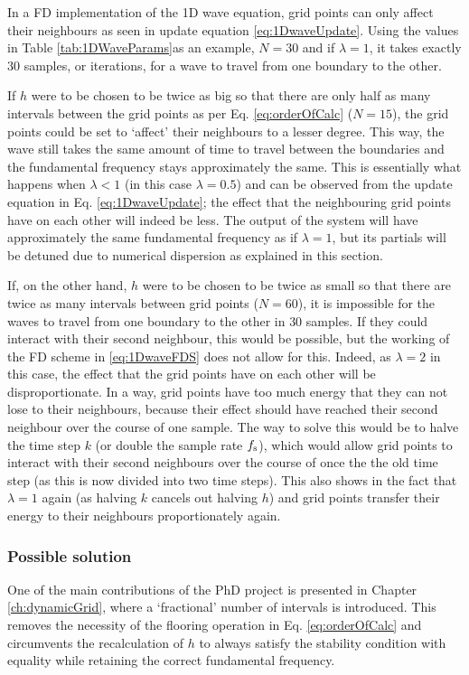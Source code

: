In a FD implementation of the 1D wave equation, grid points can only affect their neighbours as seen in update equation \eqref{eq:1DwaveUpdate}. Using the values in Table \ref{tab:1DWaveParams}as an example, $N=30$ and if $\lambda = 1$, it takes exactly $30$ samples, or iterations, for a wave to travel from one boundary to the other. 

If $h$ were to be chosen to be twice as big so that there are only half as many intervals between the grid points as per Eq. \eqref{eq:orderOfCalc} ($N=15$), the grid points could be set to `affect' their neighbours to a lesser degree. This way, the wave still takes the same amount of time to travel between the boundaries and the fundamental frequency stays approximately the same. This is essentially what happens when $\lambda < 1$ (in this case $\lambda = 0.5$) and can be observed from the update equation in Eq. \eqref{eq:1DwaveUpdate}; the effect that the neighbouring grid points have on each other will indeed be less. The output of the system will have approximately the same fundamental frequency as if $\lambda = 1$, but its partials will be detuned due to numerical dispersion as explained in this section.

If, on the other hand, $h$ were to be chosen to be twice as small so that there are twice as many intervals between grid points ($N = 60$), it is impossible for the waves to travel from one boundary to the other in $30$ samples. If they could interact with their second neighbour, this would be possible, but the working of the FD scheme in \eqref{eq:1DwaveFDS} does not allow for this. Indeed, as $\lambda = 2$ in this case, the effect that the grid points have on each other will be disproportionate. In a way, grid points have too much energy that they can not lose to their neighbours, because their effect should have reached their second neighbour over the course of one sample. The way to solve this would be to halve the time step $k$ (or double the sample rate $f_\text{s}$), which would allow grid points to interact with their second neighbours over the course of once the the old time step (as this is now divided into two time steps). This also shows in the fact that $\lambda = 1$ again (as halving $k$ cancels out halving $h$) and grid points transfer their energy to their neighbours proportionately again.

\subsubsection{Possible solution}
One of the main contributions of the PhD project is presented in Chapter \ref{ch:dynamicGrid}, where a `fractional' number of intervals is introduced. This removes the necessity of the flooring operation in Eq. \eqref{eq:orderOfCalc} and circumvents the recalculation of $h$ to always satisfy the stability condition with equality while retaining the correct fundamental frequency.
